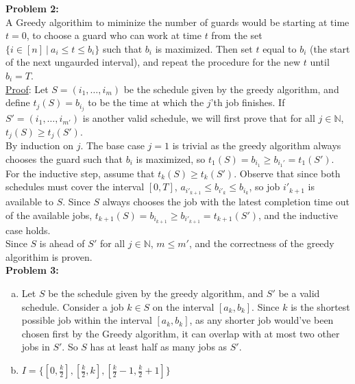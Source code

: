 \documentclass{article}
\begin{document}
\textbf{Problem 2:}  \\[1.0ex]
A Greedy algorithim to miminize the number of guards would be starting at time $t = 0$, to choose a guard who can work at time $t$ from the set $\{i \in [n]\ |\ a_i \leq t \leq b_i\}$ such that $b_i$ is maximized. Then set $t$ equal to $b_i$ (the start of the next ungaurded interval), and repeat the procedure for the new $t$ until $b_i = T$. \\[0.5ex]
\underline{Proof}: Let $S = (i_1, \dots ,i_m)$ be the schedule given by the greedy algorithm, and define $t_j(S) = b_{i_j}$ to be the time at which the $j$'th job finishes. 
If $S' = (i_1,\dots,i_{m'})$ is another valid schedule, we will first prove that for all $j \in \mathbb{N}$, $t_j(S) \geq t_j(S') $.\\[0.75ex]
By induction on $j$. The base case $j = 1$ is trivial as the greedy algorithm always chooses the guard such that $b_i$ is maximized, so $t_1(S) = b_{i_1} \geq b_{i_1'} = t_1(S')$. For the inductive step, assume that $t_k(S) \geq t_k(S')$. 
Observe that since both schedules must cover the interval $[0, T]$, $a_{i'_{k + 1}} \leq b_{i'_k} \leq b_{i_k}$, so job $i'_{k + 1}$ is available to $S$. Since $S$ always chooses 
the job with the latest completion time out of the available jobs, $t_{k + 1}(S) = b_{i_{k + 1}} \geq b_{i'_{k + 1}} = t_{k + 1}(S')$, and the inductive case holds. \\[1.0ex]
Since $S$ is ahead of $S'$ for all $j \in \mathbb{N}$, $m \leq m'$, and the correctness of the greedy algorithim is proven.\\[1.0ex]

\textbf{Problem 3:}
\begin{enumerate}[a)]
    \item Let $S$ be the schedule given by the greedy algorithm, and $S'$ be a valid schedule. Consider a job $k \in S$ on the interval $[a_k, b_k]$. Since $k$ is the shortest possible job within the interval $[a_k, b_k]$, as any shorter job would've been chosen first by the Greedy algorithm, it can overlap with at most two other jobs in $S'$. So $S$ has at least half as many jobs as $S'$.
    \item $I = \{[0, \frac{k}{2}], [\frac{k}{2}, k], [\frac{k}{2} - 1, \frac{k}{2} + 1]\}$
\end{enumerate} 
\end{document}
